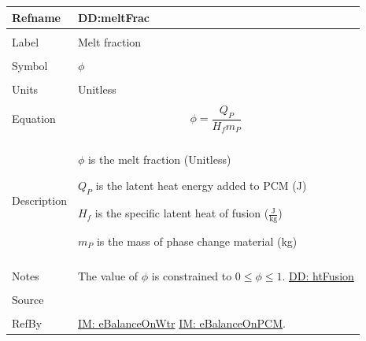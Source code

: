 \documentclass[12pt]{article}
\begin{document}
\noindent \begin{minipage}{\textwidth}
\begin{tabular}{p{} p{}}
\toprule \textbf{Refname} & \textbf{DD:meltFrac}
\label{DD:meltFrac}
\\ \midrule \\
Label & Melt fraction
\\ \midrule \\
Symbol & $ϕ$
\\ \midrule \\
Units & Unitless
\\ \midrule \\
Equation & \begin{displaymath}
           ϕ=\frac{{Q_{P}}}{{H_{f}} {m_{P}}}
           \end{displaymath}
\\ \midrule \\
Description & \begin{symbDescription}
              \item{$ϕ$ is the melt fraction (Unitless)}
              \item{${Q_{P}}$ is the latent heat energy added to PCM (J)}
              \item{${H_{f}}$ is the specific latent heat of fusion ($\frac{\text{J}}{\text{kg}}$)}
              \item{${m_{P}}$ is the mass of phase change material (kg)}
              \end{symbDescription}
\\ \midrule \\
Notes & The value of $ϕ$ is constrained to $0\leq{}ϕ\leq{}1$.
        \hyperref[DD:htFusion]{DD: htFusion}
\\ \midrule \\
Source & \cite{koothoor2013}
\\ \midrule \\
RefBy & \hyperref[IM:eBalanceOnWtr]{IM: eBalanceOnWtr} \hyperref[IM:eBalanceOnPCM]{IM: eBalanceOnPCM}.
\\ \bottomrule \end{tabular}
\end{minipage}
\end{document}
